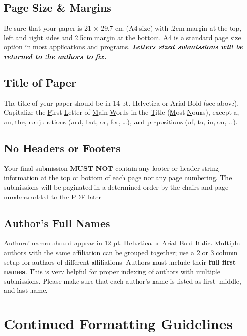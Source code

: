 \documentclass[9pt]{extarticle}
\begin{document}
\begin{multicols}{2}
\subsection{Page Size \& Margins}

Be sure that your paper is 21 × 29.7 cm (A4 size) with .2cm margin at the top, left and right sides and 2.5cm margin at the bottom.
A4 is a standard page size option in most applications and programs.
\textbf{\textit{Letters sized submissions will be returned to the authors to fix.}}

\subsection{Title of Paper}

The title of your paper should be in 14 pt. Helvetica or Arial Bold (see above). 
Capitalize the \underline{F}irst \underline{L}etter of \underline{M}ain \underline{W}ords in the \underline{T}itle (\underline{M}ost \underline{N}ouns), except a, an, the, conjunctions (and, but, or, for, …), and prepositions (of, to, in, on, …).

\subsection{No Headers or Footers}

Your final submission \textbf{MUST NOT} contain any footer or header string information at the top or bottom of each page nor any page numbering.
The submissions will be paginated in a determined order by the chairs and page numbers added to the PDF later.

\subsection{Author's Full Names}

Authors’ names should appear in 12 pt. Helvetica or Arial Bold Italic.
Multiple authors with the same affiliation can be grouped together; use a 2 or 3 column setup for authors of different affiliations.
Authors must include their \textbf{full first names}.
This is very helpful for proper indexing of authors with multiple submissions.
Please make sure that each author’s name is listed as first, middle, and last name.

\section{Continued Formatting Guidelines}


\end{multicols}
\end{document}
